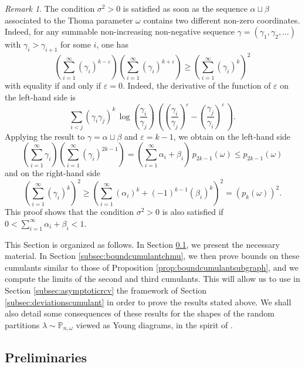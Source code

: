 \documentclass[12pt,a4paper,reqno]{amsart}
\theoremstyle{remark}
\newtheorem{remark}[lemma]{Remark}
\newcommand{\proba}{\mathbb{P}}
\newcommand{\eps}{\varepsilon}
\begin{document}
\begin{remark}\label{rem:limitvarianceispositive}
The condition $\sigma^{2}>0$ is satisfied as soon as the sequence $\alpha \sqcup \beta$ associated to the Thoma parameter $\omega$ contains two different non-zero coordinates. Indeed, for any summable non-increasing non-negative sequence $\gamma=(\gamma_{1},\gamma_{2},\ldots)$ with $\gamma_{i}>\gamma_{i+1}$ for some $i$, one has
$$\left(\sum_{i=1}^{\infty} (\gamma_{i})^{k-\eps} \right)\left(\sum_{i=1}^{\infty} (\gamma_{i})^{k+\eps} \right) \geq \left(\sum_{i=1}^{\infty} (\gamma_{i})^{k} \right)^{2}$$
with equality if and only if $\eps=0$. Indeed, the derivative of the function of $\eps$ on the left-hand side is
$$\sum_{i<j} \left(\gamma_{i}\gamma_{j}\right)^{k}\,\log\!\left(\frac{\gamma_{i}}{\gamma_{j}}\right)\,\left(\left(\frac{\gamma_{i}}{\gamma_{j}}\right)^{\!\eps}-\left(\frac{\gamma_{j}}{\gamma_{i}}\right)^{\!\eps}\,\right).$$
Applying the result to $\gamma=\alpha \sqcup \beta$ and $\eps=k-1$, we obtain on the left-hand side
$$\left(\sum_{i=1}^{\infty} \gamma_{i} \right)\left(\sum_{i=1}^{\infty} (\gamma_{i})^{2k-1} \right) = \left(\sum_{i=1}^{\infty} \alpha_{i}+\beta_{i} \right)\,p_{2k-1}(\omega)\leq p_{2k-1}(\omega)$$
and on the right-hand side
$$\left(\sum_{i=1}^{\infty} (\gamma_{i})^{k}\right)^{2} \geq \left(\sum_{i=1}^{\infty} (\alpha_{i})^{k} + (-1)^{k-1}(\beta_{i})^{k}\right)^{2}=(p_{k}(\omega))^{2}.$$
This proof shows that the condition $\sigma^{2}>0$ is also satisfied if $0<\sum_{i=1}^{\infty} \alpha_{i}+\beta_{i}<1$.
\end{remark}


This Section is organized as follows. In Section \ref{subsec:prelim_chmu}, we present the necessary material. In Section \ref{subsec:boundcumulantchmu}, we then prove bounds on these cumulants similar to those of Proposition \ref{prop:boundcumulantsubgraph}, and we compute the limits of the second and third cumulants. This will allow us to use in Section \ref{subsec:asymptoticrcv} the framework of Section \ref{subsec:deviationscumulant} in order to prove the results stated above. We shall also detail some consequences of these results for the shapes of the random partitions $\lambda \sim \proba_{n,\omega}$ viewed as Young diagrams, in the spirit of \cite{FM12,Mel12}. \bigskip



\subsection{Preliminaries}\label{subsec:prelim_chmu}
\end{document}
